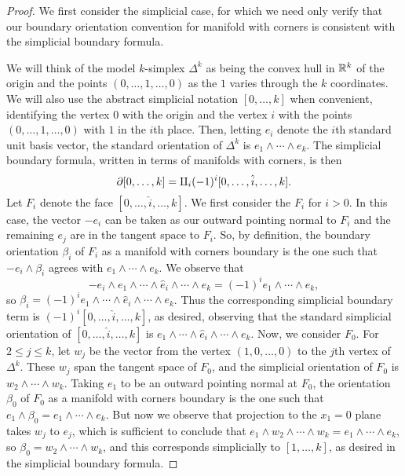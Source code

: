 \begin{proof}
	We first consider the simplicial case, for which we need only verify that our boundary orientation convention for manifold with corners is consistent with the simplicial boundary formula.

	We will think of the model $k$-simplex $\Delta^k$ as being the convex hull in $\mathbb{R}^k$ of the origin and the points $(0, \ldots , 1, \ldots, 0)$ as the $1$ varies through the $k$ coordinates.
	We will also use the abstract simplicial notation $[0,\ldots,k]$ when convenient, identifying the vertex $0$ with the origin and the vertex $i$ with the points $(0, \ldots , 1, \ldots, 0)$ with $1$ in the $i$th place.
	Then, letting $e_i$ denote the $i$th standard unit basis vector, the standard orientation of $\Delta^k$ is $e_1 \wedge \cdots \wedge e_k$.
	The simplicial boundary formula, written in terms of manifolds with corners, is then
	\[\partial [0,\ldots,k] = \amalg_i (-1)^i [0,\ldots, \hat i,\ldots, k].\]
	Let $F_i$ denote the face $[0,\ldots, \hat i,\ldots, k]$.
	We first consider the $F_i$ for $i > 0$.
	In this case, the vector $-e_i$ can be taken as our outward pointing normal to $F_i$ and the remaining $e_j$ are in the tangent space to $F_i$.
	So, by definition, the boundary orientation $\beta_i$ of $F_i$ as a manifold with corners boundary is the one such that $-e_i \wedge \beta_i$ agrees with $e_1 \wedge \cdots \wedge e_k$.
	We observe that
	\[ -e_i \wedge e_1 \wedge \cdots \wedge \hat e_i \wedge \cdots \wedge e_k = (-1)^ie_1 \wedge \cdots \wedge e_k,\]
	so $\beta_i = (-1)^i e_1 \wedge \cdots \wedge \hat e_i \wedge \cdots \wedge e_k$.
	Thus the corresponding simplicial boundary term is $(-1)^i [0,\ldots, \hat i,\ldots, k]$, as desired, observing that the standard simplicial orientation of $[0,\ldots, \hat i,\ldots, k]$ is $e_1 \wedge \cdots \wedge \hat e_i \wedge \cdots \wedge e_k$.
	Now, we consider $F_0$.
	For $2\leq j\leq k$, let $w_j$ be the vector from the vertex $(1,0,\ldots,0)$ to the $j$th vertex of $\Delta^k$.
 	These $w_j$ span the tangent space of $F_0$, and the simplicial orientation of $F_0$ is $w_2 \wedge \cdots \wedge w_k$.
	Taking $e_1$ to be an outward pointing normal at $F_0$, the orientation $\beta_0$ of $F_0$ as a manifold with corners boundary is the one such that $e_1 \wedge \beta_0 = e_1 \wedge \cdots \wedge e_k$.
	But now we observe that projection to the $x_1 = 0$ plane takes $w_j$ to $e_j$, which is sufficient to conclude that $e_1 \wedge w_2 \wedge \cdots \wedge w_k = e_1 \wedge \cdots \wedge e_k$, so $\beta_0 = w_2 \wedge \cdots \wedge w_k$, and this corresponds simplicially to $[1,\ldots, k]$, as desired in the simplicial boundary formula.


\end{proof}
